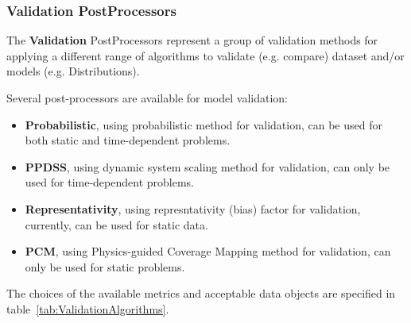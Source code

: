 \subsubsection{Validation PostProcessors}
\label{subsubsec:Validation}

The \textbf{Validation} PostProcessors represent a group of validation methods
for applying a different range of algorithms to validate (e.g. compare)
dataset and/or models (e.g. Distributions).

Several post-processors are available for model validation:
\begin{itemize}
  \item  \textbf{Probabilistic}, using probabilistic method for validation, can be used for both static and time-dependent problems.
  \item  \textbf{PPDSS}, using dynamic system scaling method for validation, can only be used for time-dependent problems.
  \item  \textbf{Representativity}, using represntativity (bias) factor for validation, currently, can be used for static data.
  \item  \textbf{PCM}, using Physics-guided Coverage Mapping method for validation, can only be used for static problems.
\end{itemize}
%

The choices of the available metrics and acceptable data objects are specified in table~\ref{tab:ValidationAlgorithms}.

